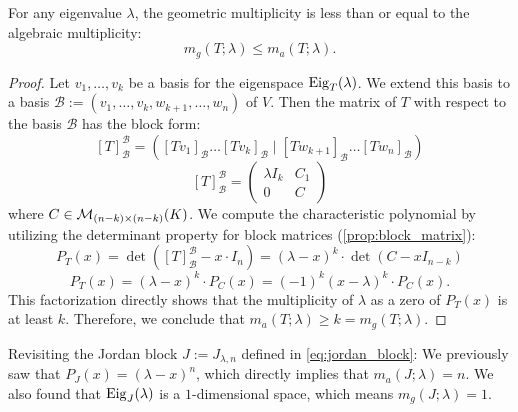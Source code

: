 \begin{proposition}
  \label{prop:mult_inequality}
  For any eigenvalue $\lambda$, the geometric multiplicity is less than or equal to the algebraic multiplicity:
  \[ m_g(T; \lambda) \le m_a(T; \lambda). \]
\end{proposition}

\begin{proof}
  Let $v_1, \dots, v_k$ be a basis for the eigenspace $\operatorname{Eig}_T(\lambda)$. We extend this basis to a basis $\mathcal{B} := (v_1, \dots, v_k, w_{k+1}, \dots, w_n)$ of $V$.
  Then the matrix of $T$ with respect to the basis $\mathcal{B}$ has the block form:
  \[ [T]_{\mathcal{B}}^{\mathcal{B}} = \left( [Tv_1]_{\mathcal{B}} \dots [Tv_k]_{\mathcal{B}} \mid [Tw_{k+1}]_{\mathcal{B}} \dots [Tw_n]_{\mathcal{B}} \right) \]
  \begin{equation} \label{eq:block_matrix_T}
    [T]_{\mathcal{B}}^{\mathcal{B}} = \left(\begin{array}{c|c} \lambda I_k & C_1 \\ \hline 0 & C \end{array}\right)
  \end{equation}
  where $C \in \mathcal{M}_{(n-k) \times (n-k)}(K)$.
  We compute the characteristic polynomial by utilizing the determinant property for block matrices (\cref{prop:block_matrix}):
  \[ P_T(x) = \det([T]_{\mathcal{B}}^{\mathcal{B}} - x \cdot I_n) = (\lambda - x)^k \cdot \det(C - x I_{n-k}) \]
  \[ P_T(x) = (\lambda - x)^k \cdot P_C(x) = (-1)^k(x - \lambda)^k \cdot P_C(x). \]
  This factorization directly shows that the multiplicity of $\lambda$ as a zero of $P_T(x)$ is at least $k$.
  Therefore, we conclude that $m_a(T;\lambda) \ge k = m_g(T;\lambda)$.
\end{proof}

\begin{example}\label{ex:jordan_block_geom_alg}
  Revisiting the Jordan block $J := J_{\lambda, n}$ defined in \eqref{eq:jordan_block}:
  We previously saw that $P_J(x) = (\lambda - x)^n$, which directly implies that $m_a(J;\lambda) = n$.
  We also found that $\operatorname{Eig}_J(\lambda)$ is a $1$-dimensional space, which means $m_g(J;\lambda) = 1$.
\end{example}

